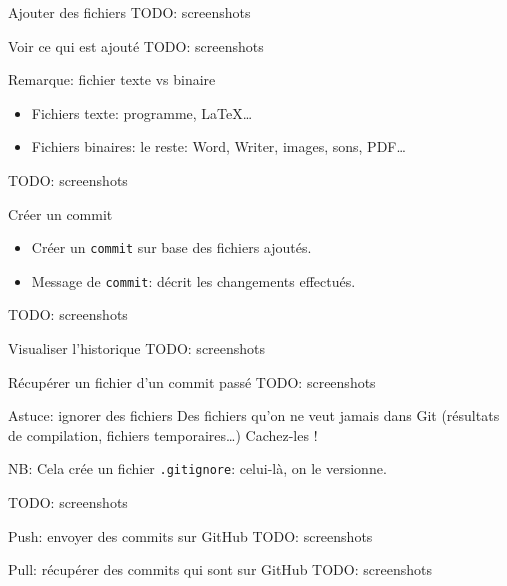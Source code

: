 \documentclass{beamer}
\begin{document}
\begin{frame}{Ajouter des fichiers}
    TODO: screenshots
\end{frame}

\begin{frame}{Voir ce qui est ajouté}
    TODO: screenshots
\end{frame}

\begin{frame}{Remarque: fichier texte vs binaire}
    \begin{itemize}
        \item Fichiers texte: programme, \LaTeX\dots
        \item Fichiers binaires: le reste: Word, Writer, images, sons, PDF\dots
    \end{itemize}
    TODO: screenshots
\end{frame}

\begin{frame}{Créer un commit}
\begin{itemize}
    \item Créer un \texttt{commit} sur base des fichiers ajoutés.
    \item Message de \texttt{commit}: décrit les changements effectués.
\end{itemize}
    TODO: screenshots
\end{frame}

\begin{frame}{Visualiser l'historique}
    TODO: screenshots
\end{frame}

\begin{frame}{Récupérer un fichier d'un commit passé}
    TODO: screenshots
\end{frame}

\begin{frame}{Astuce: ignorer des fichiers}
    Des fichiers qu'on ne veut jamais dans Git (résultats de compilation,
    fichiers temporaires\dots) Cachez-les !

    NB: Cela crée un fichier \texttt{.gitignore}: celui-là, on le versionne.

    TODO: screenshots
\end{frame}

\begin{frame}{Push: envoyer des commits sur GitHub}
    TODO: screenshots
\end{frame}

\begin{frame}{Pull: récupérer des commits qui sont sur GitHub}
    TODO: screenshots
\end{frame}
\end{document}

